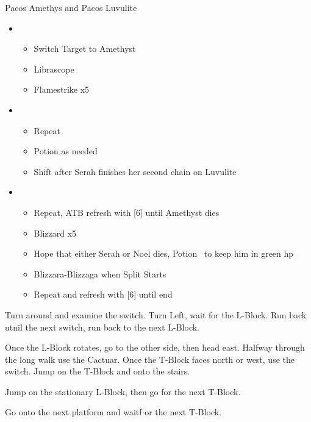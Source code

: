 \begin{battle}{Pacos Amethys and Pacos Luvulite}
	\begin{flushleft}
		\begin{itemize}
			\item \sixth
			      \begin{itemize}
				      \item Switch Target to Amethyst
				      \item Librascope
				      \item Flamestrike x5
			      \end{itemize}
			\item \third
			      \begin{itemize}
				      \item Repeat
				      \item Potion as needed
				      \item Shift after Serah finishes her second chain on Luvulite
			      \end{itemize}
			\item \fifth
			      \begin{itemize}
				      \item Repeat, ATB refresh with [6] until Amethyst dies
				      \item Blizzard x5
				      \item Hope that either Serah or Noel dies, Potion \chu\ to keep him in green hp
				      \item Blizzara-Blizzaga when Split Starts
				      \item Repeat and refresh with [6] until end
			      \end{itemize}
		\end{itemize}
	\end{flushleft}
\end{battle}

Turn around and examine the switch. Turn Left, wait for the L-Block. Run back utnil the next switch, run back to the next L-Block. 

Once the L-Block rotates, go to the other side, then head east. Halfway through the long walk use the Cactuar. Once the T-Block faces north or west, use the switch. Jump on the T-Block and onto the stairs.

Jump on the stationary L-Block, then go for the next T-Block.

Go onto the next platform and waitf or the next T-Block. 

